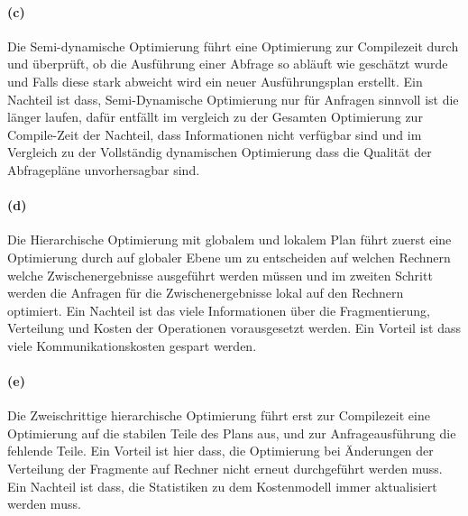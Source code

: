 \documentclass[11pt,a4paper,parskip=half ]{scrartcl}
\begin{document}
	\paragraph{(c)} Die Semi-dynamische Optimierung führt eine Optimierung zur Compilezeit durch und überprüft, ob die Ausführung einer Abfrage so abläuft wie geschätzt wurde und Falls diese stark abweicht wird ein neuer Ausführungsplan erstellt. Ein Nachteil ist dass, Semi-Dynamische Optimierung nur für Anfragen sinnvoll ist die länger laufen, dafür entfällt im vergleich zu der Gesamten Optimierung zur Compile-Zeit der Nachteil, dass Informationen nicht verfügbar sind und im Vergleich zu der Vollständig dynamischen Optimierung dass die Qualität der Abfragepläne unvorhersagbar sind.
	
	\paragraph{(d)} Die Hierarchische Optimierung mit globalem und lokalem Plan führt zuerst eine Optimierung durch auf globaler Ebene um zu entscheiden auf welchen Rechnern welche Zwischenergebnisse ausgeführt werden müssen und im zweiten Schritt werden die Anfragen für die Zwischenergebnisse lokal auf den Rechnern optimiert. Ein Nachteil ist das viele Informationen über die Fragmentierung, Verteilung und Kosten der Operationen vorausgesetzt werden. Ein Vorteil ist dass viele Kommunikationskosten gespart werden.
	
	\paragraph{(e)} Die Zweischrittige hierarchische Optimierung führt erst zur Compilezeit eine Optimierung auf die stabilen Teile des Plans aus, und zur Anfrageausführung die fehlende Teile. Ein Vorteil ist hier dass, die Optimierung bei Änderungen der Verteilung der Fragmente auf Rechner nicht erneut durchgeführt werden muss. Ein Nachteil ist dass, die Statistiken zu dem Kostenmodell immer aktualisiert werden muss.
	
\end{document}
